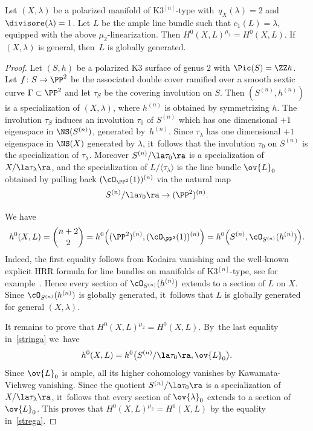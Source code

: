 \begin{prop}\label{prop:sezinv}
Let $(X,\lambda)\!$ be a polarized \HK manifold of $\mathrm{K3}^{[n]}$-type with~\hbox{$q_X(\lambda)\!=\!2$} and $\divisore(\lambda)=1$.
Let $L$ be the ample line bundle such that $c_1(L)=\lambda$, equipped with the above $\mu_2$-linearization.
Then $H^0(X,L)^{\mu_2}=H^0(X,L)$.
If $(X,\lambda)$ is general, then~$L$ is globally generated.
\end{prop}

\begin{proof}
Let $(S,h)$ be a polarized K3 surface of genus $2$ with $\Pic(S)=\ZZ h$.
Let $f\colon S\to\PP^2$ be the associated double cover ramified over a smooth sextic curve $\Gamma\subset \PP^2$ and let $\tau_S$ be the covering involution on $S$.
Then $(S^{(n)},h^{(n)})$ is a specialization of $(X,\lambda)$, where $h^{(n)}$ is obtained by symmetrizing $h$.
The involution $\tau_S$ induces an involution $\tau_0$ of $S^{(n)}$ which has one dimensional $+1$ eigenspace in $\NS(S^{(n)})$, generated by~$h^{(n)}$.
Since $\tau_{\lambda}$ has one dimensional $+1$ eigenspace in $\NS(X)$ generated by $\lambda$, it~follows that the involution $\tau_0$ on $S^{(n)}$ is the specialization of $\tau_{\lambda}$.
Moreover $S^{(n)}/\la\tau_0\ra$ is a specialization of $X/\la\tau_{\lambda}\ra$, and the specialization of $L/\langle \tau_\lambda\rangle$ is the line bundle $\ov{L}_0$ obtained by pulling back $(\cO_{\PP^2}(1))^{(n)}$
via the natural map\vspace*{-3pt}\enlargethispage{\baselineskip}
\begin{equation*}
S^{(n)}/\la\tau_0\ra\to(\PP^2)^{(n)}.
\end{equation*}
\par\vspace*{-5pt}%
\noindent
We have\vspace*{-5pt}
\begin{equation}\label{stringa}
h^0(X,L)=\binom{n+2}{2}=h^0\Bigl((\PP^2)^{(n)},(\cO_{\PP^2}(1))^{(n)}\Bigr)=h^0\Bigl(S^{(n)},\cO_{S^{(n)}}(h^{(n)})\Bigr).
\end{equation}
Indeed, the first equality follows from Kodaira vanishing and the well-known explicit HRR formula for line bundles on \HK manifolds of K3$^{[n]}$-type, see for example~\cite[Eq.\,(5)]{Debarre:Survey}.
Hence every section of $\cO_{S^{(n)}}(h^{(n)})$ extends to a section of $L$ on $X$.
Since $\cO_{S^{(n)}}(h^{(n)})$ is globally generated, it~follows that $L$ is globally generated for general $(X,\lambda)$.

It remains to prove that $H^0(X,L)^{\mu_2}\!=\!H^0(X,L)$. By~the last equality in~\eqref{stringa} we~have\vspace*{-5pt}
\begin{equation}\label{strega}
h^0(X,L)=h^0\bigl(S^{(n)}/\la\tau_0\ra,\ov{L}_0\bigr).
\end{equation}
Since $\ov{L}_0$ is ample, all its higher cohomology vanishes by Kawamata-Viehweg vanishing.
Since the quotient $S^{(n)}/\la \tau_0\ra$ is a specialization of $X/\la\tau_{\lambda}\ra$, it~follows that every section of $\ov{\lambda}_0$ extends to a section of $\ov{L}_0$. This proves that $H^0(X,L)^{\mu_2}=H^0(X,L)$ by the equality in~\eqref{strega}.
\end{proof}

